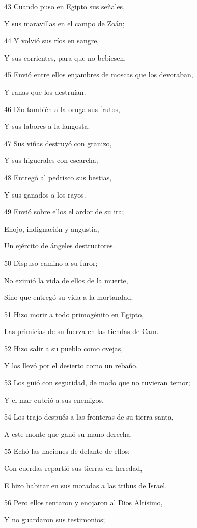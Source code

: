 \par 43 Cuando puso en Egipto sus señales,
\par Y sus maravillas en el campo de Zoán;
\par 44 Y volvió sus ríos en sangre,
\par Y sus corrientes, para que no bebiesen.
\par 45 Envió entre ellos enjambres de moscas  que los devoraban,
\par Y ranas que los destruían.
\par 46 Dio también a la oruga sus frutos,
\par Y sus labores a la langosta.
\par 47 Sus viñas destruyó con granizo,
\par Y sus higuerales con escarcha;
\par 48 Entregó al pedrisco sus bestias,
\par Y sus ganados a los rayos.
\par 49 Envió sobre ellos el ardor de su ira;
\par Enojo, indignación y angustia,
\par Un ejército de ángeles destructores.
\par 50 Dispuso camino a su furor;
\par No eximió la vida de ellos de la muerte,
\par Sino que entregó su vida a la mortandad.
\par 51 Hizo morir a todo primogénito en Egipto,
\par Las primicias de su fuerza en las tiendas de Cam.
\par 52 Hizo salir a su pueblo como ovejas,
\par Y los llevó por el desierto como un rebaño.
\par 53 Los guió con seguridad, de modo que no tuvieran temor;
\par Y el mar cubrió a sus enemigos.
\par 54 Los trajo después a las fronteras de su tierra santa,
\par A este monte que ganó su mano derecha.
\par 55 Echó las naciones de delante de ellos;
\par Con cuerdas repartió sus tierras en heredad,
\par E hizo habitar en sus moradas a las tribus de Israel.
\par 56 Pero ellos tentaron y enojaron al Dios Altísimo,
\par Y no guardaron sus testimonios;

